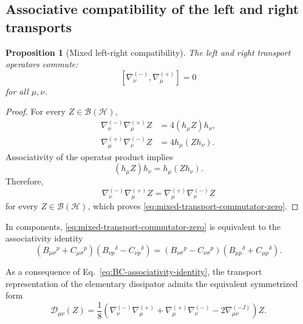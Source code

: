 \documentclass[notitlepage,aip,reprint,onecolumn]{revtex4-1}
\newtheorem{proposition}[theorem]{Proposition}
\theoremstyle{definition}
\begin{document}
\subsection{Associative compatibility of the left and right transports}

\begin{proposition}[Mixed left-right compatibility]
The left and right transport operators commute:
\begin{equation}\label{eq:mixed-transport-commutator-zero}
    \left[
    \nabla^{(-)}_\nu,
    \nabla^{(+)}_\mu
    \right]
    =
    0
\end{equation}
for all \(\mu,\nu\).
\end{proposition}

\begin{proof}
For every \(Z\in\mathcal B(\mathcal H)\),
\begin{align*}
    \nabla^{(-)}_\nu\nabla^{(+)}_\mu Z
    &=
    4(h_\mu Z)h_\nu,
    \\
    \nabla^{(+)}_\mu\nabla^{(-)}_\nu Z
    &=
    4h_\mu(Zh_\nu).
\end{align*}
Associativity of the operator product implies
\[
    (h_\mu Z)h_\nu
    =
    h_\mu(Zh_\nu).
    \]
    Therefore,
    \[
    \nabla^{(-)}_\nu\nabla^{(+)}_\mu Z
    =
    \nabla^{(+)}_\mu\nabla^{(-)}_\nu Z
\]
for every \(Z\in\mathcal B(\mathcal H)\), which proves \eqref{eq:mixed-transport-commutator-zero}.
\end{proof}

In components, \eqref{eq:mixed-transport-commutator-zero} is equivalent to the associativity identity
\begin{equation}\label{eq:BC-associativity-identity}
\left(
B_{\mu\sigma}{}^p+C_{\mu\sigma}{}^p
\right)
\left(
B_{\nu p}{}^\delta-C_{\nu p}{}^\delta
\right)
=
\left(
B_{\nu\sigma}{}^p-C_{\nu\sigma}{}^p
\right)
\left(
B_{\mu p}{}^\delta+C_{\mu p}{}^\delta
\right).
\end{equation}

As a consequence of Eq.~\eqref{eq:BC-associativity-identity}, the transport representation of the elementary dissipator admits the equivalent symmetrized form
\begin{equation}\label{eq:D-symmetrized}
\mathcal D_{\mu\nu}(Z)
=
\frac18
\left(
\nabla^{(-)}_\nu\nabla^{(+)}_\mu
+
\nabla^{(+)}_\mu\nabla^{(-)}_\nu
-
2\nabla^{(-J)}_{\mu\nu}
\right)Z.
\end{equation}
\end{document}
